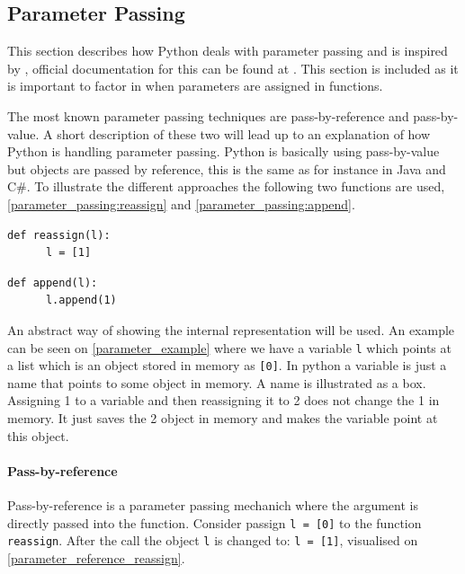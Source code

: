 \subsection{Parameter Passing}\label{python:parameter_passing}
This section describes how Python deals with parameter passing and is inspired by \citet{parameter_passing}, official documentation for this can be found at \citet{parameter_passing_official}.
This section is included as it is important to factor in when parameters are assigned in functions.

The most known parameter passing techniques are pass-by-reference and pass-by-value.
A short description of these two will lead up to an explanation of how Python is handling parameter passing.
Python is basically using pass-by-value but objects are passed by reference, this is the same as for instance in Java and C\#.
To illustrate the different approaches the following two functions are used, \cref{parameter_passing:reassign} and \cref{parameter_passing:append}.

\begin{lstlisting}[style=python, caption={Parameter passing: \texttt{reassign} function.}, label={parameter_passing:reassign}]
  def reassign(l):
      l = [1]
\end{lstlisting}

\begin{lstlisting}[style=python, caption={Parameter passing: \texttt{append} function.}, label={parameter_passing:append}]
  def append(l):
      l.append(1)
\end{lstlisting}

An abstract way of showing the internal representation will be used.
An example can be seen on \cref{parameter_example} where we have a variable \texttt{l} which points at a list which is an object stored in memory as \texttt{[0]}.
In python a variable is just a name that points to some object in memory.
A name is illustrated as a box.
Assigning 1 to a variable and then reassigning it to 2 does not change the 1 in memory.
It just saves the 2 object in memory and makes the variable point at this object.


\paragraph{Pass-by-reference}
Pass-by-reference is a parameter passing mechanich where the argument is directly passed into the function.
Consider passign \texttt{l = [0]} to the function \texttt{reassign}.
After the call the object \texttt{l} is changed to: \texttt{l = [1]}, visualised on \cref{parameter_reference_reassign}.

